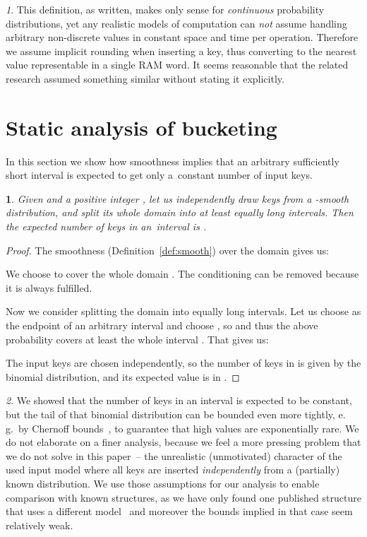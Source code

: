 \documentclass[
submission
, nomarks
]{dmtcs-episciences}
\theoremstyle{plain}
\theoremstyle{definition}
\theoremstyle{remark}
\newtheorem*{rem*}{\protect\remarkname}
\theoremstyle{plain}
\newtheorem*{lem*}{\protect\lemmaname}
\theoremstyle{plain}
\newcounter{lemma}
\providecommand{\lemmaname}{Lemma}
\providecommand{\remarkname}{Remark}
\begin{document}
\begin{rem*}
This definition, as written, makes only sense for \emph{continuous} probability
distributions, yet any realistic models of computation can
\emph{not} assume handling arbitrary non-discrete values in constant
space and time per operation. Therefore we assume implicit rounding
when inserting a key, thus converting to the nearest value representable
in a single RAM word. It seems reasonable that the related research
assumed something similar without stating it explicitly.
\end{rem*}



\section{Static analysis of bucketing}
 \label{sec:smooth-bucket}
In this section we show how smoothness implies that an arbitrary sufficiently
short interval is expected to get only a~constant number of input keys.
\begin{lem*}
\label{lem:smooth-bucket}
Given  and a positive
integer , let us independently draw  keys from a -smooth
distribution, and split its whole domain into at least 
equally long intervals. Then the expected number of keys in an~interval
is .
\end{lem*}
\begin{proof}
The smoothness (Definition~\ref{def:smooth}) over the domain  gives us:

We choose to cover the whole domain . The conditioning can be removed because it is always fulfilled.


Now we consider splitting the domain into  equally long intervals.
Let us choose  as the endpoint of an arbitrary
interval  and choose , so
 and thus the above probability covers at least the whole interval . That gives us:
 
The input keys are chosen independently, so the number of keys in  is given by the binomial distribution, and its expected value
 is in .
\end{proof}

\begin{rem*}
We showed that the number of keys in an interval is expected to be constant, but the tail of that binomial distribution can be bounded even more tightly, e.\,g.~by Chernoff bounds~\cite[chapter~4.1]{randomAlgs}, to guarantee that high values are exponentially rare.
We do not elaborate on a finer analysis, because we feel a more pressing problem that we do not solve in this paper~-- the unrealistic (unmotivated) character of the used input model where all keys are inserted \emph{independently} from a (partially) known distribution.
We use those assumptions for our analysis to enable comparison with known structures, as we have only found one published structure that uses a different model~\cite{DemaineJP04} and moreover the bounds implied in that case seem relatively weak.
\end{rem*}
\end{document}
